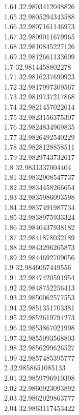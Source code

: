 {1.64	32.9803412048826\\
1.65	32.9805294343588\\
1.66	32.9807161146973\\
1.67	32.9809011679965\\
1.68	32.9810845227126\\
1.69	32.9812661133609\\
1.7	32.9814458802278\\
1.71	32.9816237690923\\
1.72	32.9817997309567\\
1.73	32.9819737217868\\
1.74	32.9821457022614\\
1.75	32.9823156375307\\
1.76	32.9824834969835\\
1.77	32.9826492540229\\
1.78	32.9828128858511\\
1.79	32.9829743732617\\
1.8	32.9831337004404\\
1.81	32.9832908547737\\
1.82	32.9834458266654\\
1.83	32.9835986093598\\
1.84	32.9837491987734\\
1.85	32.9838975933324\\
1.86	32.9840437938182\\
1.87	32.9841878032189\\
1.88	32.9843296265873\\
1.89	32.9844692709056\\
1.9	32.9846067449556\\
1.91	32.9847420591954\\
1.92	32.9848752256413\\
1.93	32.9850062577553\\
1.94	32.9851351703381\\
1.95	32.9852619794273\\
1.96	32.9853867021998\\
1.97	32.9855093568803\\
1.98	32.9856299626527\\
1.99	32.9857485395777\\
2	32.9858651085133\\
2.01	32.9859796910398\\
2.02	32.9860923093892\\
2.03	32.9862029863777\\
2.04	32.9863117453422\\
}

